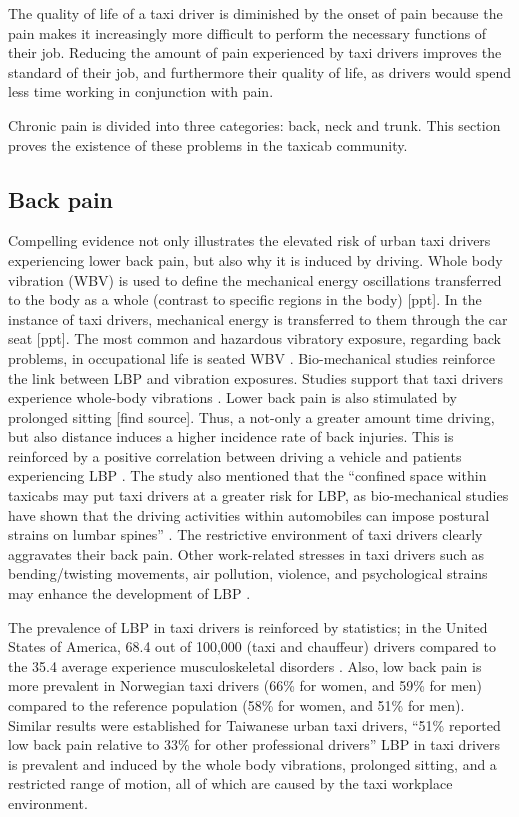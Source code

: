 \documentclass[11pt]{article}
\begin{document}
The quality of life of a taxi driver is diminished
by the onset of pain because the pain makes it increasingly more difficult to perform the 
necessary functions of their job. Reducing the amount of pain
experienced by taxi drivers improves the standard of their job, and
furthermore their quality of life, as drivers would spend
less time working in conjunction with pain.

Chronic pain is divided into three categories: back, neck and trunk.
This section proves the existence of these problems in the taxicab community.

\subsection{Back pain}
Compelling evidence not only illustrates the elevated risk of urban
taxi drivers experiencing lower back pain, but also why it is induced
by driving. Whole body vibration (WBV) is used to define the
mechanical energy oscillations transferred to the body as a whole
(contrast to specific regions in the body) [ppt]. In the instance of
taxi drivers, mechanical energy is transferred to them through the car
seat [ppt]. The most common and hazardous vibratory exposure,
regarding back problems, in occupational life is seated WBV
\cite{ODrivers@Risk}. Bio-mechanical studies reinforce the link
between LBP and vibration exposures. Studies support that taxi drivers
experience whole-body vibrations \cite{KneePain, Serious}. Lower back
pain is also stimulated by prolonged sitting [find source]. Thus, a
not-only a greater amount time driving, but also distance induces a
higher incidence rate of back injuries\cite{Question?}. This is
reinforced by a positive correlation between driving a vehicle and
patients experiencing LBP \cite{ODrivers@Risk}. The study also
mentioned that the “confined space within taxicabs may put taxi
drivers at a greater risk for LBP, as bio-mechanical studies have
shown that the driving activities within automobiles can impose
postural strains on lumbar spines” \cite{KneePain}. The restrictive
environment of taxi drivers clearly aggravates their back pain. Other
work-related stresses in taxi drivers such as bending/twisting
movements, air pollution, violence, and psychological strains may
enhance the development of LBP \cite{KneePain, POSTULATED}. 

The prevalence of LBP in taxi drivers is reinforced by statistics; in the
United States of America, 68.4 out of 100,000 (taxi and chauffeur)
drivers compared to the 35.4 average experience musculoskeletal
disorders \cite{68}. Also, low back pain is more prevalent in
Norwegian taxi drivers (66\% for women, and 59\% for men) compared to
the reference population (58\% for women, and 51\% for men). Similar
results were established for Taiwanese urban taxi drivers, “51\%
reported low back pain relative to 33\% for other professional
drivers” \cite{Question?} LBP in taxi drivers is prevalent and induced
by the whole body vibrations, prolonged sitting, and a restricted
range of motion, all of which are caused by the taxi workplace
environment.
 
\end{document}
